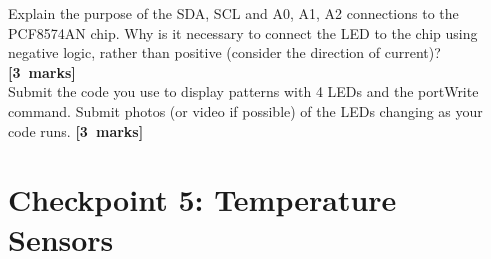 Explain the purpose of the SDA, SCL and A0, A1, A2 connections to the PCF8574AN chip.
Why is it necessary to connect the LED to the chip using negative logic, rather than positive (consider the direction of current)?
\hfill {\bf[3~marks]} \\

Submit the code you use to display patterns with 4 LEDs and the portWrite command.
Submit photos (or video if possible) of the LEDs changing as your code runs.
\hfill {\bf[3~marks]} \\



\newpage
\section{Checkpoint 5: Temperature Sensors}

